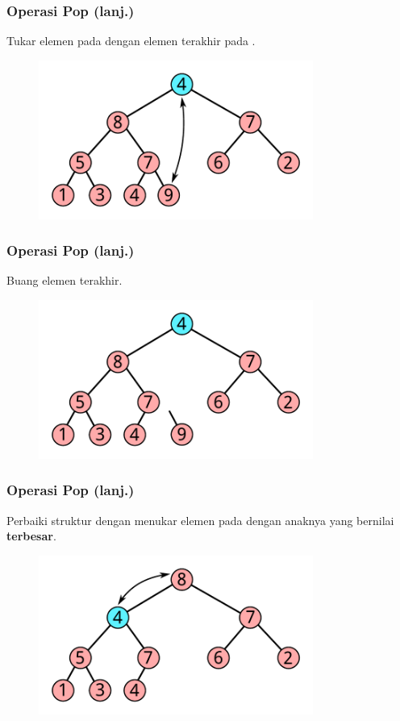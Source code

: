 \begin{frame}
\frametitle{Operasi Pop (lanj.)}
Tukar elemen pada  dengan elemen terakhir pada .
\begin{figure}
  \includegraphics[width=9cm]{asset/pop-2.pdf}
\end{figure}
\end{frame}

\begin{frame}
\frametitle{Operasi Pop (lanj.)}
Buang elemen terakhir.
\begin{figure}
  \includegraphics[width=9cm]{asset/pop-3.pdf}
\end{figure}
\end{frame}

\begin{frame}
\frametitle{Operasi Pop (lanj.)}
Perbaiki struktur \pheap dengan menukar elemen pada  dengan anaknya yang bernilai \textbf{terbesar}.
\begin{figure}
  \includegraphics[width=9cm]{asset/pop-4.pdf}
\end{figure}
\end{frame}

